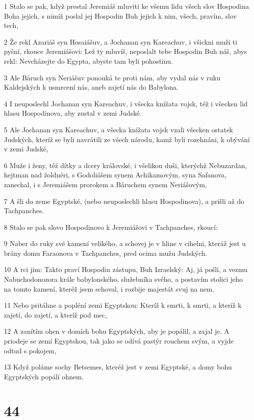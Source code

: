 \par 1 Stalo se pak, když prestal Jeremiáš mluviti ke všemu lidu všech slov Hospodina Boha jejich, s nimiž poslal jej Hospodin Buh jejich k nim, všech, pravím, slov tech,
\par 2 Že rekl Azariáš syn Hosaiášuv, a Jochanan syn Kareachuv, i všickni muži ti pyšní, rkouce Jeremiášovi: Lež ty mluvíš, neposlalt tebe Hospodin Buh náš, abys rekl: Nevcházejte do Egypta, abyste tam byli pohostinu.
\par 3 Ale Báruch syn Neriášuv ponouká te proti nám, aby vydal nás v ruku Kaldejských k usmrcení nás, aneb zajetí nás do Babylona.
\par 4 I neuposlechl Jochanan syn Kareachuv, i všecka knížata vojsk, též i všecken lid hlasu Hospodinova, aby zustal v zemi Judské.
\par 5 Ale Jochanan syn Kareachuv, a všecka knížata vojsk vzali všecken ostatek Judských, kteríž se byli navrátili ze všech národu, kamž byli rozehnáni, k obývání v zemi Judské,
\par 6 Muže i ženy, též dítky a dcery královské, i všelikou duši, kterýchž Nebuzardan, hejtman nad žoldnéri, s Godoliášem synem Achikamovým, syna Safanova, zanechal, i s Jeremiášem prorokem a Báruchem synem Neriášovým,
\par 7 A šli do zeme Egyptské, (nebo neuposlechli hlasu Hospodinova), a prišli až do Tachpanches.
\par 8 Stalo se pak slovo Hospodinovo k Jeremiášovi v Tachpanches, rkoucí:
\par 9 Naber do ruky své kamení velikého, a schovej je v hline v cihelni, kteráž jest u brány domu Faraonova v Tachpanches, pred ocima mužu Judských.
\par 10 A rci jim: Takto praví Hospodin zástupu, Buh Izraelský: Aj, já pošli, a vezmu Nabuchodonozora krále babylonského, služebníka svého, a postavím stolici jeho na tomto kamení, kteréž jsem schoval, i rozbije majestát svuj na nem.
\par 11 Nebo pritáhne a popléní zemi Egyptskou: Kteríž k smrti, k smrti, a kteríž k zajetí, do zajetí, a kteríž pod mec,
\par 12 A zanítím ohen v domích bohu Egyptských, aby je popálil, a zajal je. A priodeje se zemí Egyptskou, tak jako se odívá pastýr rouchem svým, a vyjde odtud s pokojem,
\par 13 Když poláme sochy Betsemes, kteréž jest v zemi Egyptské, a domy bohu Egyptských popálí ohnem.

\chapter{44}

